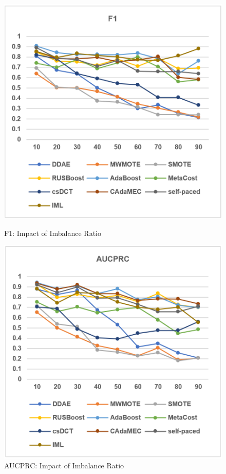 \begin{figure}[h]
    \centering 
    \begin{minipage}[t]{0.45\textwidth}
        \vspace{0pt}
        \includegraphics[width=\textwidth]{images/fig17}
        \caption{F1: Impact of Imbalance Ratio}
        \label{fig17}
    \end{minipage}
    \quad
    \begin{minipage}[t]{0.45\textwidth}
        \vspace{0pt}
        \includegraphics[width=\textwidth]{images/fig16}
        \caption{AUCPRC: Impact of Imbalance Ratio}
        \label{fig16}
    \end{minipage}
\end{figure}

